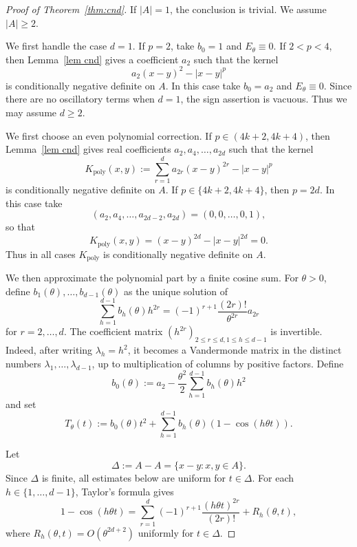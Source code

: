 \documentclass[11pt]{article}
\theoremstyle{definition}
\begin{document}
\begin{proof}[Proof of Theorem~\ref{thm:cnd}]
If \(|A|=1\), the conclusion is trivial. We assume \(|A|\ge2\).

We first handle the case \(d=1\). If \(p=2\), take \(b_0=1\) and \(E_\theta\equiv0\). If \(2<p<4\), then Lemma~\ref{lem cnd} gives a coefficient \(a_2\) such that the kernel
\[
a_2(x-y)^2-|x-y|^p
\]
is conditionally negative definite on \(A\). In this case take \(b_0=a_2\) and \(E_\theta\equiv0\). Since there are no oscillatory terms when \(d=1\), the sign assertion is vacuous. Thus we may assume \(d\ge2\).

We first choose an even polynomial correction. If \(p\in(4k+2,4k+4)\), then Lemma~\ref{lem cnd} gives real coefficients \(a_2,a_4,\dots,a_{2d}\) such that the kernel
\[
K_{\mathrm{poly}}(x,y)
:=
\sum_{r=1}^d a_{2r}(x-y)^{2r}-|x-y|^p
\]
is conditionally negative definite on \(A\). If \(p\in\{4k+2,4k+4\}\), then \(p=2d\). In this case take
\[
(a_2,a_4,\dots,a_{2d-2},a_{2d})=(0,0,\dots,0,1),
\]
so that
\[
K_{\mathrm{poly}}(x,y)=(x-y)^{2d}-|x-y|^{2d}=0.
\]
Thus in all cases \(K_{\mathrm{poly}}\) is conditionally negative definite on \(A\).

We then approximate the polynomial part by a finite cosine sum. For \(\theta>0\), define \(b_1(\theta),\dots,b_{d-1}(\theta)\) as the unique solution of
\begin{equation}\label{eq bi}
\sum_{h=1}^{d-1} b_h(\theta)h^{2r}
=
(-1)^{r+1}\frac{(2r)!}{\theta^{2r}}a_{2r}
\end{equation}
for \( r=2,\ldots,d.\)
The coefficient matrix \((h^{2r})_{2\le r\le d,1\le h\le d-1}\) is invertible. Indeed, after writing \(\lambda_h=h^2\), it becomes a Vandermonde matrix in the distinct numbers \(\lambda_1,\dots,\lambda_{d-1}\), up to multiplication of columns by positive factors. Define
\begin{equation}\label{eq b0}
b_0(\theta):=a_2-\frac{\theta^2}{2}\sum_{h=1}^{d-1}b_h(\theta)h^2
\end{equation}
and set
\[
T_\theta(t):=b_0(\theta)t^2+\sum_{h=1}^{d-1}b_h(\theta)(1-\cos(h\theta t)).
\]

Let
\[
\Delta:=A-A=\{x-y:x,y\in A\}.
\]
Since \(\Delta\) is finite, all estimates below are uniform for \(t\in\Delta\). For each \( h\in\{1,\dots,d-1\}\), Taylor's formula gives
\[
1-\cos(h\theta t)
=
\sum_{r=1}^d (-1)^{r+1}\frac{(h\theta t)^{2r}}{(2r)!}
+R_h(\theta,t),
\]
where \(R_h(\theta,t)=O(\theta^{2d+2})\) uniformly for \(t\in\Delta\).


\end{proof}
\end{document}

